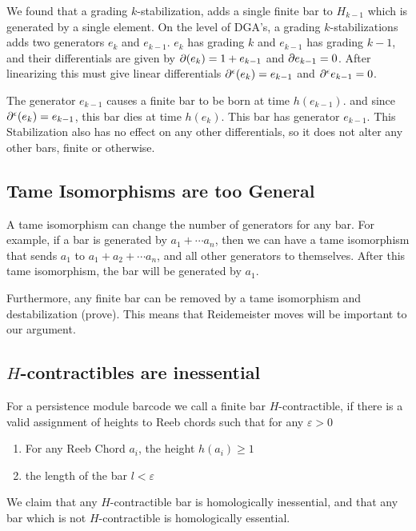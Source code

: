 \documentclass[11pt,oneside]{amsart}
\begin{document}
    We found that a grading $k$-stabilization, adds a single finite bar to $H_{k-1}$ which is generated by a single element. On the level of DGA's, a grading $k$-stabilizations adds two generators $e_k$ and $e_{k-1}$. $e_k$ has grading $k$ and $e_{k-1}$ has grading $k-1$, and their differentials are given by $\partial (e_k) = 1 + e_{k-1}$ and $\partial e_{k-1} = 0$. After linearizing this must give linear differentials $\partial^\epsilon (e_k) = e_{k-1}$ and $\partial^\epsilon e_{k-1} = 0$. 

    The generator $e_{k-1}$ causes a finite bar to be born at time $h(e_{k-1})$. and since $\partial^\epsilon (e_k) = e_{k-1}$, this bar dies at time $h(e_k)$. This bar has generator $e_{k-1}$. This Stabilization also has no effect on any other differentials, so it does not alter any other bars, finite or otherwise.

\subsection{Tame Isomorphisms are too General}

    A tame isomorphism can change the number of generators for any bar. For example, if a bar is generated by $a_1 + \cdots a_n$, then we can have a tame isomorphism that sends $a_1$ to $a_1 + a_2 + \cdots a_n$, and all other generators to themselves. After this tame isomorphism, the bar will be generated by $a_1$.

    Furthermore, any finite bar can be removed by a tame isomorphism and destabilization (\TODO prove). This means that Reidemeister moves will be important to our argument.

\subsection{$H$-contractibles are inessential}
    \begin{definition}
        For a persistence module barcode we call a finite bar $H$-contractible, if there is a valid assignment of heights to Reeb chords such that for any $\varepsilon > 0$
        \begin{enumerate}
            \item For any Reeb Chord $a_i$, the height $h(a_i) \geq 1$
            \item the length of the bar $l < \varepsilon$
        \end{enumerate}
    \end{definition}

    We claim that any $H$-contractible bar is homologically inessential, and that any bar which is not $H$-contractible is homologically essential.
\end{document}

